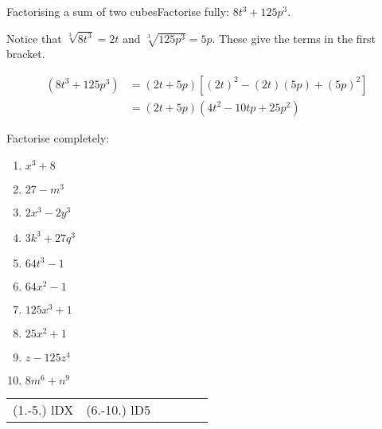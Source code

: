 \begin{wex}{Factorising a sum of two cubes}{Factorise fully:  $8t^{3} +125p^{3}$.}
{

Notice that $\sqrt[3]{8t^{3}} = 2t$ and $\sqrt[3]{125p^{3}} = 5p$. These give the terms in the first bracket.

\begin{align*}
  (8t^{3} +125p^{3}) &= (2t + 5p)\left[(2t)^{2} - (2t)(5p)+(5p)^{2}\right] \\
                     &= (2t+5p)(4t^{2} - 10tp + 25p^{2})
\end{align*}

}
\end{wex}


\begin{exercises}{}
{

Factorise completely:
\begin{multicols}{2}
\begin{enumerate}[itemsep=5pt, label=\textbf{\arabic*}. ] 
\item ${x}^{3}+8$
\item $27-m^{3}$
\item $2x^{3}-2y^{3}$
\item $3k^{3} + 27q^{3}$
\item $64t^{3}-1$
\item $64x^{2} -1$
\item $125x^{3} +1$
\item $25x^{2} +1$
\item $z-125z^4{}$
\item $8m^{6} + n^{9}$
\end{enumerate}
\end{multicols}
\practiceinfo 
\par 
 \par \begin{tabular}[h]{cccccc}
 (1.-5.) lDX   & (6.-10.) lD5 &  \end{tabular}
}
\end{exercises}

